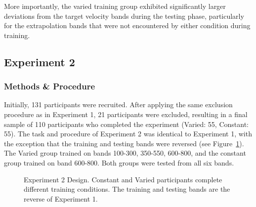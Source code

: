 \documentclass[
  11pt,
  letterpaper,
]{article}
\begin{document}
More importantly, the varied training group exhibited significantly
larger deviations from the target velocity bands during the testing
phase, particularly for the extrapolation bands that were not
encountered by either condition during training.

\subsection{Experiment 2}\label{experiment-2-1}

\subsubsection{Methods \& Procedure}\label{methods-procedure}

Initially, 131 participants were recruited. After applying the same
exclusion procedure as in Experiment 1, 21 participants were excluded,
resulting in a final sample of 110 participants who completed the
experiment (Varied: 55, Constant: 55). The task and procedure of
Experiment 2 was identical to Experiment 1, with the exception that the
training and testing bands were reversed (see
Figure~\ref{fig-design-e2}). The Varied group trained on bands 100-300,
350-550, 600-800, and the constant group trained on band 600-800. Both
groups were tested from all six bands.

\begin{figure}


\caption{\label{fig-design-e2}Experiment 2 Design. Constant and Varied
participants complete different training conditions. The training and
testing bands are the reverse of Experiment 1.}

\end{figure}%
\end{document}
